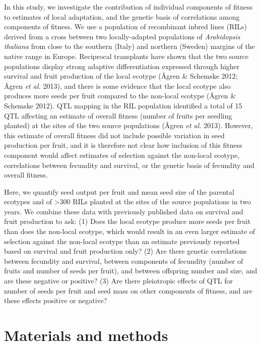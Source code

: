 \documentclass[12pt,]{article}
\begin{document}
In this study, we investigate the contribution of individual components of fitness to estimates of local adaptation, and the genetic basis of correlations among components of fitness.
We use a population of recombinant inbred lines (RILs) derived from a cross between two locally-adapted populations of \emph{Arabidopsis thaliana} from close to the southern (Italy) and northern (Sweden) margins of the native range in Europe. Reciprocal transplants have shown that the two source populations display strong adaptive differentiation expressed through higher survival and fruit production of the local ecotype (Ågren \& Schemske 2012; Ågren \emph{et al.} 2013), and there is some evidence that the local ecotype also produces more seeds per fruit compared to the non-local ecotype (Ågren \& Schemske 2012). QTL mapping in the RIL population identified a total of 15 QTL affecting an estimate of overall fitness (number of fruits per seedling planted) at the sites of the two source populations (Ågren \emph{et al.} 2013). However, this estimate of overall fitness did not include possible variation in seed production per fruit, and it is therefore not clear how inclusion of this fitness component would affect estimates of selection against the non-local ecotype, correlations between fecundity and survival, or the genetic basis of fecundity and overall fitness.

Here, we quantify seed output per fruit and mean seed size of the parental ecotypes and of \textgreater{}300 RILs planted at the sites of the source populations in two years. We combine these data with previously published data on survival and fruit production to ask: (1) Does the local ecotype produce more seeds per fruit than does the non-local ecotype, which would result in an even larger estimate of selection against the non-local ecotype than an estimate previously reported based on survival and fruit production only? (2) Are there genetic correlations between fecundity and survival, between components of fecundity (number of fruits and number of seeds per fruit), and between offspring number and size, and are these negative or positive? (3) Are there pleiotropic effects of QTL for number of seeds per fruit and seed mass on other components of fitness, and are these effects positive or negative?

\hypertarget{materials-and-methods}{%
\section{Materials and methods}\label{materials-and-methods}}
\end{document}
